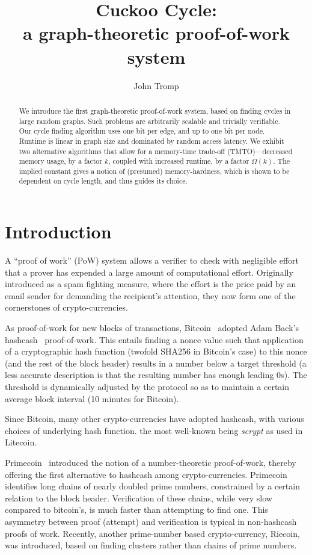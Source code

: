 \documentclass[11pt, oneside]{article}
\title{Cuckoo Cycle: \protect\\ a graph-theoretic proof-of-work system}
\author{John Tromp}
\begin{document}
\maketitle

\begin{abstract}
We introduce the first graph-theoretic proof-of-work system,
based on finding cycles in large random graphs.
Such problems are arbitrarily scalable and trivially verifiable.
Our cycle finding algorithm uses one bit per edge, and up to one bit per node.
Runtime is linear in graph size and dominated by random access latency.
We exhibit two alternative algorithms that allow for a memory-time trade-off
(TMTO)---decreased memory usage, by a factor $k$, coupled with increased runtime, by a factor $\Omega(k)$.
The implied constant gives a notion of (presumed) memory-hardness, which is shown to be dependent on cycle length,
and thus guides its choice.
\end{abstract}

\section{Introduction}
A ``proof of work'' (PoW) system allows a verifier to check with negligible
effort that a prover has expended a large amount of computational effort.
Originally introduced as a spam fighting measure, 
where the effort is the price paid by an email sender for demanding the
recipient's attention, they now form one of the cornerstones of
crypto-currencies.

As proof-of-work for new blocks of transactions,
Bitcoin~\cite{nakamoto2009bitcoin} adopted Adam Back's hashcash~\cite{back2002} proof-of-work.
This entails finding a nonce value such that
application of a cryptographic hash function (twofold SHA256 in Bitcoin's case)
to this nonce (and the rest of the block header) results in a number below a target threshold
(a less accurate description is that the resulting number has enough leading 0s).
The threshold is dynamically adjusted by the protocol
so as to maintain a certain average block interval (10 minutes for Bitcoin).

Since Bitcoin, many other crypto-currencies have adopted hashcash, with various
choices of underlying hash function. the most well-known being {\em scrypt} as
used in Litecoin.

Primecoin~\cite{king2013} introduced the notion of a number-theoretic proof-of-work,
thereby offering the first alternative to hashcash among crypto-currencies.
Primecoin identifies long chains of nearly doubled prime numbers, constrained
by a certain relation to the block header.
Verification of these chains, while very slow compared to bitcoin's, is much faster
than attempting to find one.
This asymmetry between proof (attempt) and verification is typical in non-hashcash proofs of work.
Recently, another prime-number based crypto-currency, Riecoin, was introduced, based
on finding clusters rather than chains of prime numbers.
\end{document}
